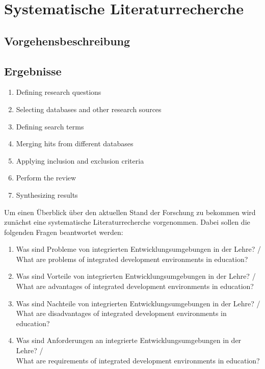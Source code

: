 \chapter{Systematische Literaturrecherche} \label{systematische_literaturrecherche}

\section{Vorgehensbeschreibung}

\section{Ergebnisse}

\begin{enumerate}
    \item Defining research questions
    \item Selecting databases and other research sources
    \item Defining search terms
    \item Merging hits from different databases
    \item Applying inclusion and exclusion criteria
    \item Perform the review
    \item Synthesizing results
\end{enumerate}

Um einen Überblick über den aktuellen Stand der Forschung zu bekommen wird zunächst eine systematische Literaturrecherche vorgenommen. Dabei sollen die folgenden Fragen beantwortet werden:

\begin{enumerate}
    \item Was sind Probleme von integrierten Entwicklungsumgebungen in der Lehre? /\\
          What are problems of integrated development environments in education?
    \item Was sind Vorteile von integrierten Entwicklungsumgebungen in der Lehre? /\\
          What are advantages of integrated development environments in education?
    \item Was sind Nachteile von integrierten Entwicklungsumgebungen in der Lehre? /\\
          What are disadvantages of integrated development environments in education?
    \item Was sind Anforderungen an integrierte Entwicklungsumgebungen in der Lehre? /\\
          What are requirements of integrated development environments in education?
\end{enumerate}

